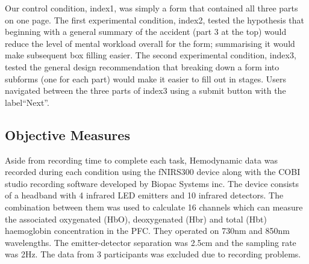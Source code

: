 \documentclass[../main/Feedback.tex]{subfiles}
\begin{document}
Our control condition, index1, was simply a form that contained all three parts on one page. 
The first experimental condition, index2, tested the hypothesis that beginning with a general summary of the accident (part 3 at the top) would reduce the level of mental workload overall for the form; summarising it would make subsequent box filling easier.
The second experimental condition, index3, tested the general design recommendation that breaking down a form into subforms (one for each part) would make it easier to fill out in stages. %
Users navigated between the three parts of index3 using a submit button with the label``Next''.



\subsection{Objective Measures}
Aside from recording time to complete each task, Hemodynamic data was recorded during each condition using the fNIRS300 device along with the COBI studio recording software developed by Biopac Systems inc.
The device consists of a headband with 4 infrared LED emitters and 10 infrared detectors.
The combination between them was used to calculate 16 channels which can measure the associated oxygenated (HbO), deoxygenated (Hbr) and total (Hbt) haemoglobin concentration in the PFC.
They operated on 730nm and 850nm wavelengths.
The emitter-detector separation was 2.5cm and the sampling rate was 2Hz.
The data from 3 participants was excluded due to recording problems.
\end{document}
